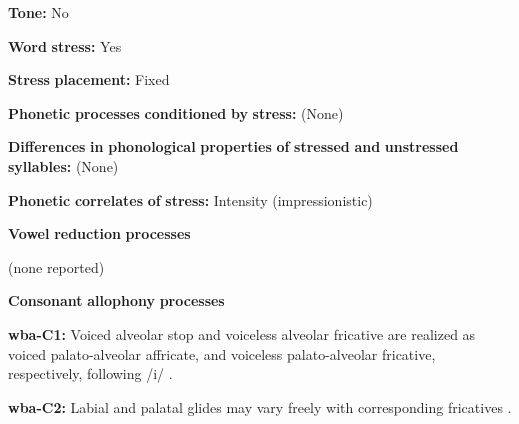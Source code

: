 \documentclass[output=paper]{langsci/langscibook}
\begin{document}
\begin{styleBody}
\textbf{Tone:} No
\end{styleBody}

\begin{styleBody}
\textbf{Word} \textbf{stress:} Yes
\end{styleBody}

\begin{styleBody}
\textbf{Stress} \textbf{placement:} Fixed
\end{styleBody}

\begin{styleBody}
\textbf{Phonetic} \textbf{processes} \textbf{conditioned} \textbf{by} \textbf{stress:} (None)
\end{styleBody}

\begin{styleBody}
\textbf{Differences} \textbf{in} \textbf{phonological} \textbf{properties} \textbf{of} \textbf{stressed} \textbf{and} \textbf{unstressed} \textbf{syllables:} (None)
\end{styleBody}

\begin{styleBody}
\textbf{Phonetic} \textbf{correlates} \textbf{of} \textbf{stress:} Intensity (impressionistic)
\end{styleBody}

\begin{styleBody}
\textbf{Vowel} \textbf{reduction} \textbf{processes}
\end{styleBody}

\begin{styleBody}
(none reported)
\end{styleBody}

\begin{styleBody}
\textbf{Consonant} \textbf{allophony} \textbf{processes}
\end{styleBody}

\begin{styleBody}
\textbf{wba-C1:} Voiced alveolar stop and voiceless alveolar fricative are realized as voiced palato-alveolar affricate, and voiceless palato-alveolar fricative, respectively, following /i/ \citep[121]{Arinterol2000}.
\end{styleBody}

\begin{styleBody}
\textbf{wba-C2:} Labial and palatal glides may vary freely with corresponding fricatives \citep[122]{Arinterol2000}.
\end{styleBody}
\end{document}
